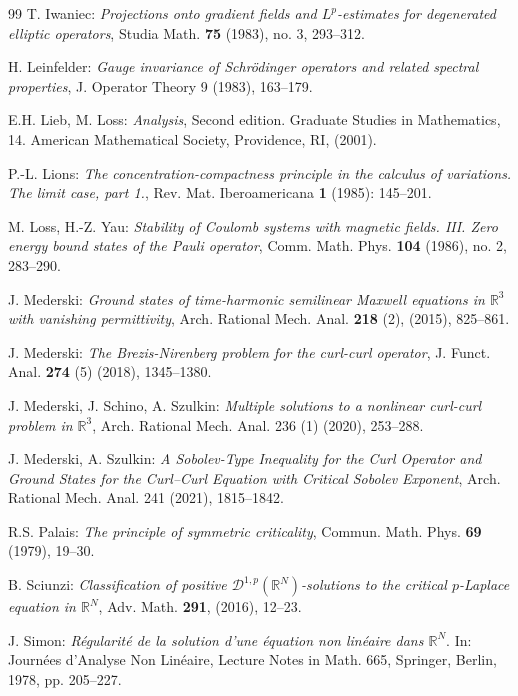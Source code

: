 \documentclass[12pt,leqno,twoside]{amsart}
\def\R{\mathbb{R}}
\def\rn{\mathbb{R}^N}
\newcommand{\cD}{{\mathcal D}}
\def\rn{\mathbb{R}^N}
\numberwithin{equation}{section}
\begin{document}
{\begin{thebibliography}{99}
 T. Iwaniec: {\em Projections onto gradient fields and $L^p$-estimates for degenerated elliptic operators}, Studia Math. {\bf 75} (1983), no. 3, 293--312. 



 H. Leinfelder: \emph{Gauge invariance of Schr\"odinger operators and related spectral properties}, J. Operator Theory 9 (1983), 163--179.



 E.H. Lieb, M. Loss: {\em Analysis}, Second edition. Graduate Studies in Mathematics, 14. American Mathematical Society, Providence, RI, (2001).


 P.-L. Lions: {\em The concentration-compactness principle in the calculus of variations. The limit case,
part 1.}, Rev. Mat. Iberoamericana {\bf 1} (1985): 145--201.

 M. Loss, H.-Z. Yau: {\em Stability of Coulomb systems with magnetic fields. III. Zero energy bound states of the Pauli operator}, Comm. Math. Phys. {\bf 104} (1986), no. 2, 283--290.

 J. Mederski: {\em Ground states of time-harmonic semilinear Maxwell equations in $\R^3$ with vanishing permittivity}, Arch. Rational Mech. Anal. {\bf 218} (2), (2015), 825--861.

 J. Mederski: {\em The Brezis-Nirenberg problem for the curl-curl operator}, J. Funct. Anal. {\bf 274} (5) (2018), 1345--1380.

 J. Mederski, J. Schino, A. Szulkin: {\em Multiple solutions to a nonlinear curl-curl problem in $\R^3$}, Arch. Rational Mech. Anal. 236 (1) (2020), 253--288.

 J. Mederski, A. Szulkin: {\em A Sobolev-Type Inequality for the Curl Operator and Ground States for the Curl--Curl Equation with Critical Sobolev Exponent}, Arch. Rational Mech. Anal. 241 (2021), 1815--1842.




 R.S. Palais: \emph{The principle of symmetric criticality}, Commun. Math. Phys. {\bf 69} (1979), 19--30.

 B. Sciunzi: {\em Classification of positive $\cD^{1,p}(\R^N)$-solutions to the critical $p$-Laplace equation in $\R^N$}, Adv. Math.  {\bf 291}, (2016), 12--23.

 J. Simon: \emph{R\'egularit\'e de la solution d'une \'equation non lin\'eaire dans $\rn$}. In: Journ\'ees d'Analyse Non Lin\'eaire,  Lecture Notes in Math. 665, Springer, Berlin, 1978, pp. 205--227.


\end{thebibliography}}
\end{document}
